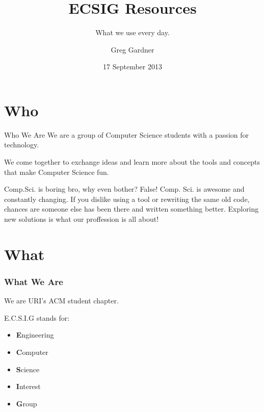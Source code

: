 \documentclass{beamer}
\title{ECSIG Resources}
\subtitle{What we use every day.}
\author{Greg Gardner}
\date{17 September 2013}
\begin{document}
\frame{\titlepage}


\section{Who}
\begin{frame}{Who We Are}
We are a group of Computer Science students with a passion for technology. \\\hfill
	
We come together to exchange ideas and learn more about the tools and concepts that make Computer Science fun.\\\hfill

  \begin{block}{Comp.Sci. is boring bro, why even bother?}
	False!  Comp. Sci. is awesome and constantly changing.  If you dislike using a tool or rewriting the same old code, chances are someone else has been there and written something better.  Exploring new solutions is what our proffession is all about!
  \end{block}
\end{frame}

\section{What}
\begin{frame}\frametitle{What We Are}
We are URI's ACM student chapter.\\\hfill

E.C.S.I.G stands for:
  \begin{itemize}
    \item {\bf E}ngineering
    \item {\bf C}omputer
		\item {\bf S}cience
		\item {\bf I}nterest
		\item {\bf G}roup
  \end{itemize}

\end{frame}
\end{document}
